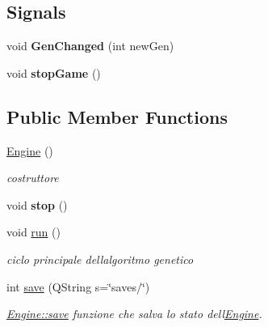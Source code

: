 \subsection*{Signals}
\begin{DoxyCompactItemize}
\item 
\mbox{\label{classEngine_a0ce8ae215f05529c846d759f73e3ada9}} 
void {\bfseries Gen\+Changed} (int new\+Gen)
\item 
\mbox{\label{classEngine_a7dfc2258b3a03132a049c8ecfb2d449f}} 
void {\bfseries stop\+Game} ()
\end{DoxyCompactItemize}
\subsection*{Public Member Functions}
\begin{DoxyCompactItemize}
\item 
\mbox{\label{classEngine_a8c98683b0a3aa28d8ab72a8bcd0d52f2}} 
\hyperlink{classEngine_a8c98683b0a3aa28d8ab72a8bcd0d52f2}{Engine} ()
\begin{DoxyCompactList}\small\item\em costruttore \end{DoxyCompactList}\item 
\mbox{\label{classEngine_ac88ada17b33bc5ddaf6bb73e0cdc67f3}} 
void {\bfseries stop} ()
\item 
\mbox{\label{classEngine_a1a210cf30d6bd330b3649439ecd6d6cc}} 
void \hyperlink{classEngine_a1a210cf30d6bd330b3649439ecd6d6cc}{run} ()
\begin{DoxyCompactList}\small\item\em ciclo principale dell\textquotesingle{}algoritmo genetico \end{DoxyCompactList}\item 
int \hyperlink{classEngine_a28dd4d5ff6c82749e651a0254076812a}{save} (Q\+String s=\char`\"{}saves/\char`\"{})
\begin{DoxyCompactList}\small\item\em \hyperlink{classEngine_a28dd4d5ff6c82749e651a0254076812a}{Engine\+::save} funzione che salva lo stato dell\textquotesingle{}\hyperlink{classEngine}{Engine}. \end{DoxyCompactList}\end{DoxyCompactItemize}
